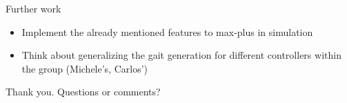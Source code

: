 \documentclass{beamer}
\begin{document}
\begin{frame}{Further work}
	\begin{itemize}\setlength\itemsep{3em}
		\item Implement the already mentioned features to max-plus in simulation
		\item Think about generalizing the gait generation for different controllers within the group (Michele's, Carlos')
	\end{itemize}
\end{frame}

\begin{frame}
 \hspace{2cm} Thank you. Questions or comments?
\end{frame}
\end{document}

